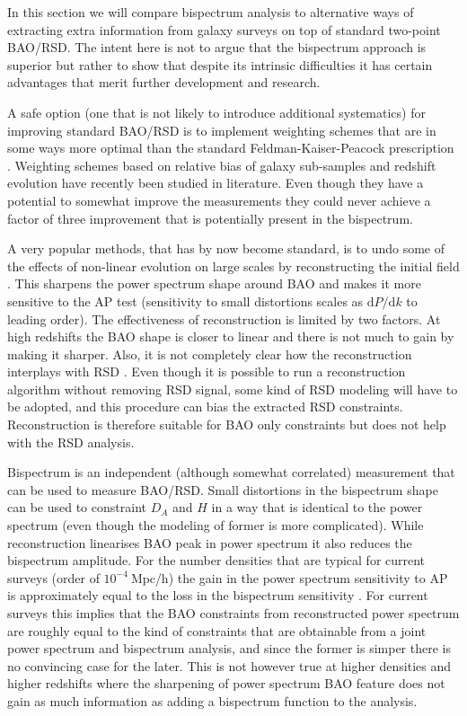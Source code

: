 In this section we will compare bispectrum analysis to alternative ways of
extracting extra information from galaxy surveys on top of standard two-point
BAO/RSD. The intent here is not to argue that the bispectrum approach is
superior but rather to show that despite its intrinsic difficulties it has
certain advantages that merit further development and research.

A safe option (one that is not likely to introduce additional systematics) for
improving standard BAO/RSD is to implement weighting schemes that
are in some ways more optimal than the standard Feldman-Kaiser-Peacock
prescription \cite{1994ApJ...426...23F}. Weighting schemes based on relative
bias of galaxy sub-samples \cite{2004MNRAS.347..645P,2016MNRAS.463.2708P} and redshift evolution \cite{2017MNRAS.464.2698R,2015MNRAS.451..236Z} have recently
been studied in literature. Even though they have a potential to somewhat
improve the measurements they could never achieve a factor of three improvement
that is potentially present in the bispectrum.

A very popular methods, that has by now become standard, is to undo some of the
effects of non-linear evolution on large scales by reconstructing the initial
field
\cite{2012MNRAS.427.2132P,2009PhRvD..80l3501N,2009PhRvD..79f3523P,2007ApJ...664..675E}.
This sharpens the power spectrum shape around BAO and makes it more sensitive
to the AP test (sensitivity to small distortions scales as
$\mathrm{d}P/\mathrm{d}k$ to leading order). The effectiveness of
reconstruction is limited by two factors. At high redshifts the BAO shape is
closer to linear and there is not much to gain by making it sharper. Also, it
is not completely clear how the reconstruction interplays with RSD
\cite{2018arXiv180804384S}.  Even though it is possible to run a reconstruction
algorithm without removing RSD signal, some kind of RSD modeling will have to
be adopted, and this procedure can bias the extracted RSD constraints.
Reconstruction is therefore suitable for BAO only constraints but does not help
with the RSD analysis.

Bispectrum is an independent (although somewhat correlated) measurement that
can be used to measure BAO/RSD. Small distortions in the
bispectrum shape can be used to constraint $D_A$ and $H$ in a way that is
identical to the power spectrum (even though the modeling of former is more
complicated). While reconstruction linearises BAO peak in power spectrum it
also reduces the bispectrum amplitude. For the number densities that are
typical for current surveys (order of $10^{-4}\ \mathrm{Mpc}$/h) the gain in
the power spectrum sensitivity to AP is approximately equal to the loss in the
bispectrum sensitivity \cite{2017MNRAS.469.1738S}. For current surveys this
implies that the BAO constraints from reconstructed power spectrum are roughly
equal to the kind of constraints that are obtainable from a joint power
spectrum and bispectrum analysis, and since the former is simper there is no
convincing case for the later. This is not however true at higher densities and
higher redshifts where the sharpening of power spectrum BAO feature does not
gain as much information as adding a bispectrum function to the analysis. 

